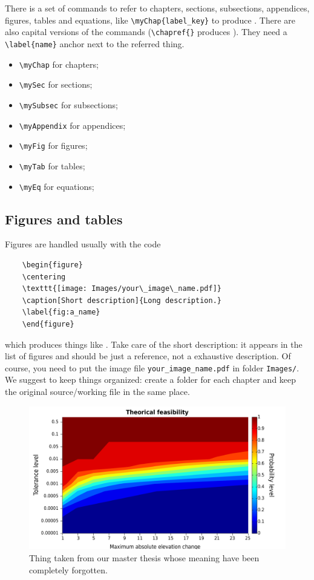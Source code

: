 There is a set of commands to refer to chapters, sections, subsections, appendices, figures, tables and equations, like \verb!\myChap{label_key}! to produce .
There are also capital versions of the commands (\verb!\chapref{}! produces ).
They need a \verb!\label{name}! anchor next to the referred thing.
\begin{itemize}
	\item\verb!\myChap! for chapters;
	\item\verb!\mySec! for sections;
	\item\verb!\mySubsec! for subsections;
	\item\verb!\myAppendix! for appendices;
	\item\verb!\myFig! for figures;
	\item\verb!\myTab! for tables;
	\item\verb!\myEq! for equations;
\end{itemize}

\subsection{Figures and tables}
Figures are handled usually with the code
\begin{verbatim}
	\begin{figure}
	\centering
	\texttt{[image: Images/your\_image\_name.pdf]} 
	\caption[Short description]{Long description.}
	\label{fig:a_name}
	\end{figure}
\end{verbatim}
which produces things like . 
Take care of the short description: it appears in the list of figures and should be just a reference, not a exhaustive description.
Of course, you need to put the image file \verb!your_image_name.pdf! in folder \verb!Images/!.
We suggest to keep things organized: create a folder for each chapter and keep the original source/working file in the same place.
	
\begin{figure}
\centering
\includegraphics[width=\columnwidth]{Images/Technicalities/feasibilityNR51.pdf}  
\caption[Thing taken from our master thesis]{Thing taken from our master thesis whose meaning have been completely forgotten.}
\end{figure}

